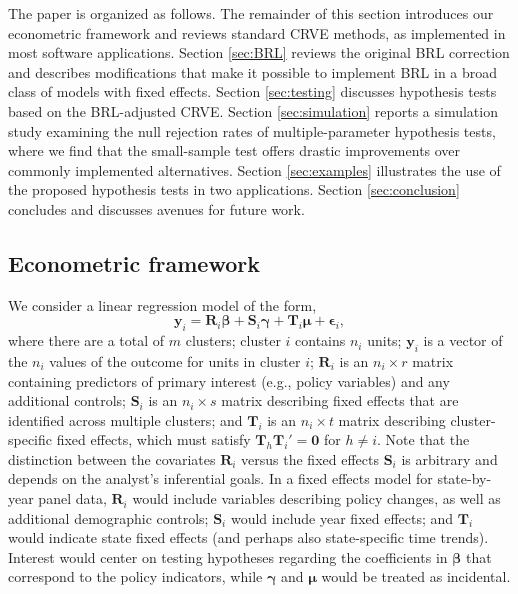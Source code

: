 \documentclass[12pt]{article}\usepackage[]{graphicx}\usepackage[]{color}
\newcommand{\bm}{\mathbf}
\newcommand{\bs}{\boldsymbol}
\begin{document}
The paper is organized as follows. The remainder of this section introduces our econometric framework and reviews standard CRVE methods, as implemented in most software applications.
Section \ref{sec:BRL} reviews the original BRL correction and describes modifications that make it possible to implement BRL in a broad class of models with fixed effects.
Section \ref{sec:testing} discusses hypothesis tests based on the BRL-adjusted CRVE. 
Section \ref{sec:simulation} reports a simulation study examining the null rejection rates of multiple-parameter hypothesis tests, where we find that the small-sample test offers drastic improvements over commonly implemented alternatives. 
Section \ref{sec:examples} illustrates the use of the proposed hypothesis tests in two applications. 
Section \ref{sec:conclusion} concludes and discusses avenues for future work. 

\subsection{Econometric framework}

We consider a linear regression model of the form,
\begin{equation}
\label{eq:fixed_effects}
\bm{y}_i = \bm{R}_i \bs\beta + \bm{S}_i \bs\gamma + \bm{T}_i \bs\mu + \bs\epsilon_i,
\end{equation}
where there are a total of $m$ clusters; cluster $i$ contains $n_i$ units; $\bm{y}_i$ is a vector of the $n_i$ values of the outcome for units in cluster $i$;  $\bm{R}_i$ is an $n_i \times r$ matrix containing predictors of primary interest (e.g., policy variables) and any additional controls; $\bm{S}_i$ is an $n_i \times s$ matrix describing fixed effects that are identified across multiple clusters; and $\bm{T}_i$ is an $n_i \times t$ matrix describing cluster-specific fixed effects, which must satisfy $\bm{T}_h \bm{T}_i' = \bm{0}$ for $h \neq i$.
Note that the distinction between the covariates $\bm{R}_i$ versus the fixed effects $\bm{S}_i$ is arbitrary and depends on the analyst's inferential goals.
In a fixed effects model for state-by-year panel data, $\bm{R}_i$ would include variables describing policy changes, as well as additional demographic controls; $\bm{S}_i$ would include year fixed effects; and $\bm{T}_i$ would indicate state fixed effects (and perhaps also state-specific time trends). 
Interest would center on testing hypotheses regarding the coefficients in $\bs\beta$ that correspond to the policy indicators, while $\bs\gamma$ and $\bs\mu$ would be treated as incidental. 
\end{document}
